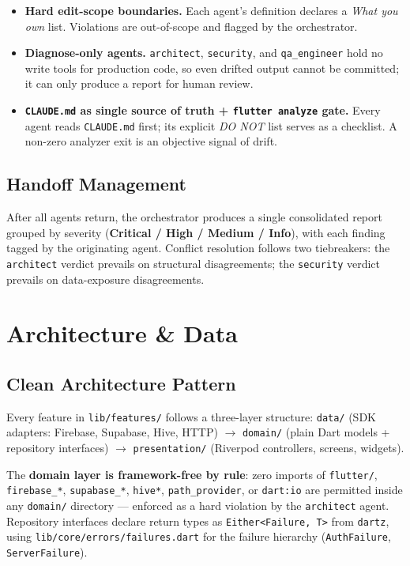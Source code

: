 \documentclass[11pt,a4paper]{article}
\begin{document}
\begin{itemize}
  \item \textbf{Hard edit-scope boundaries.} Each agent's definition declares a
    \textit{What you own} list. Violations are out-of-scope and flagged by the orchestrator.
  \item \textbf{Diagnose-only agents.} \texttt{architect}, \texttt{security}, and
    \texttt{qa\_engineer} hold no write tools for production code, so even drifted output
    cannot be committed; it can only produce a report for human review.
  \item \textbf{\texttt{CLAUDE.md} as single source of truth + \texttt{flutter analyze}
    gate.} Every agent reads \texttt{CLAUDE.md} first; its explicit \textit{DO NOT} list
    serves as a checklist. A non-zero analyzer exit is an objective signal of drift.
\end{itemize}

\subsection{Handoff Management}

After all agents return, the orchestrator produces a single consolidated report grouped
by severity (\textbf{Critical / High / Medium / Info}), with each finding tagged by the
originating agent. Conflict resolution follows two tiebreakers: the \texttt{architect}
verdict prevails on structural disagreements; the \texttt{security} verdict prevails on
data-exposure disagreements.

\section{Architecture \& Data}

\subsection{Clean Architecture Pattern}

Every feature in \texttt{lib/features/} follows a three-layer structure:
\texttt{data/} (SDK adapters: Firebase, Supabase, Hive, HTTP) $\rightarrow$
\texttt{domain/} (plain Dart models + repository interfaces) $\rightarrow$
\texttt{presentation/} (Riverpod controllers, screens, widgets).

The \textbf{domain layer is framework-free by rule}: zero imports of
\texttt{flutter/}, \texttt{firebase\_*}, \texttt{supabase\_*}, \texttt{hive*},
\texttt{path\_provider}, or \texttt{dart:io} are permitted inside any \texttt{domain/}
directory — enforced as a hard violation by the \texttt{architect} agent. Repository
interfaces declare return types as \texttt{Either<Failure,\,T>} from \texttt{dartz},
using \texttt{lib/core/errors/failures.dart} for the failure hierarchy
(\texttt{AuthFailure}, \texttt{ServerFailure}).
\end{document}
